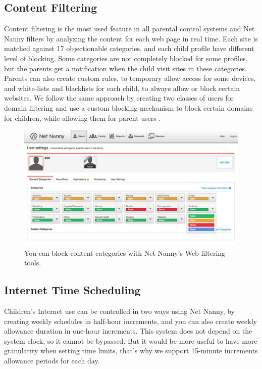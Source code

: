 \subsection{Content Filtering}

Content filtering is the most used feature in all parental control systems and Net Nanny filters by analyzing the content for each web page in real time. Each site is matched against 17 objectionable categories, and each child profile have different level of blocking. Some categories are not completely blocked for some profiles, but the parents get a notification when the child visit sites in these categories. Parents can also create custom rules, to temporary allow access for some devices, and white-lists and blacklists for each child, to always allow or block certain websites. We follow the same approach by creating two classes of users for domain filtering and use a custom blocking mechanism to block certain domains for children, while allowing them for parent users \citep{netNannyTomsGuide}.

\begin{figure}[th]
\centering
\includegraphics[width=1\textwidth]{Figures/netnanny}
\decoRule
\caption{You can block content categories with Net Nanny's Web filtering tools.}
\label{fig:netnanny}
\end{figure}

\subsection{Internet Time Scheduling}

Children's Internet use can be controlled in two ways using Net Nanny, by creating weekly schedules in half-hour increments, and you can also create weekly allowance duration in one-hour increments. This system does not depend on the system clock, so it cannot be bypassed. But it would be more useful to have more granularity when setting time limits, that's why we support 15-minute increments allowance periods for each day.

